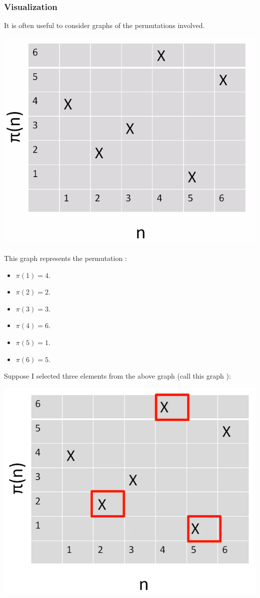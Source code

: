 \documentclass[letterpaper]{article}
\begin{document}
\subsubsection{Visualization}
It is often useful to consider graphs of the permutations involved. 
\begin{center}
    \includegraphics[scale=0.40]{img/main_permutation.PNG}
\end{center}
This graph represents the permutation :
\begin{itemize}
    \item $\pi(1) = 4$.
    \item $\pi(2) = 2$.
    \item $\pi(3) = 3$.
    \item $\pi(4) = 6$.
    \item $\pi(5) = 1$.
    \item $\pi(6) = 5$.
\end{itemize}
Suppose I selected three elements from the above graph (call this graph ):
\begin{center}
    \includegraphics[scale=0.3]{img/main_permutation_s.PNG}
\end{center}
\end{document}
